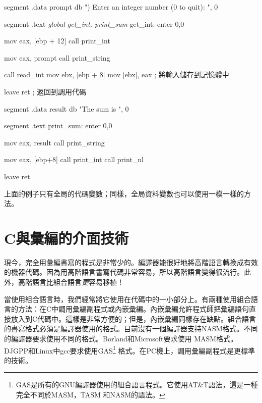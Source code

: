 \begin{AsmCodeListing}[label=sub4.asm,commandchars=\\\{\}]

segment .data
prompt  db      ") Enter an integer number (0 to quit): ", 0

segment .text
\textit{        global  get_int, print_sum}
get_int:
        enter   0,0

        mov     eax, [ebp + 12]
        call    print_int

        mov     eax, prompt
        call    print_string

        call    read_int
        mov     ebx, [ebp + 8]
        mov     [ebx], eax         ; 將輸入儲存到記憶體中

        leave
        ret                        ; 返回到調用代碼

segment .data
result  db      "The sum is ", 0

segment .text
print_sum:
        enter   0,0

        mov     eax, result
        call    print_string

        mov     eax, [ebp+8]
        call    print_int
        call    print_nl

        leave
        ret
\end{AsmCodeListing}

上面的例子只有全局的代碼變數；同樣，全局資料變數也可以使用一模一樣的方法。

\section{C與彙編的介面技術}

現今，完全用彙編書寫的程式是非常少的。編譯器能很好地將高階語言轉換成有效的機器代碼。因為用高階語言書寫代碼非常容易，所以高階語言變得很流行。此外，高階語言比組合語言\emph{更}容易移植！

當使用組合語言時，我們經常將它使用在代碼中的一小部分上。有兩種使用組合語言的方法：在C中調用彙編副程式或內嵌彙編。內嵌彙編允許程式師把彙編語句直接放入到C代碼中。這樣是非常方便的；但是，內嵌彙編同樣存在缺點。組合語言的書寫格式必須是編譯器使用的格式。目前沒有一個編譯器支持NASM格式。不同的編譯器要求使用不同的格式。Borland和Microsoft要求使用
MASM格式。DJGPP和Linux中gcc要求使用GAS\footnote{GAS是所有的GNU編譯器使用的組合語言程式。它使用AT\&T語法，這是一種完全不同於MASM，TASM 和NASM的語法。}
格式。在PC機上，調用彙編副程式是更標準的技術。


